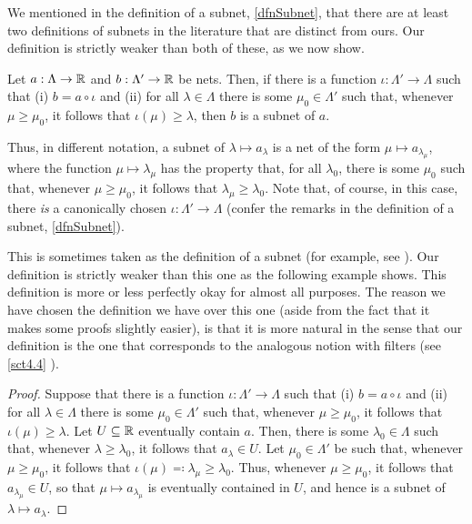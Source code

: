 We mentioned in the definition of a subnet, \cref{dfnSubnet}, that there are at least two definitions of subnets in the literature that are distinct from ours.  Our definition is strictly weaker than both of these, as we now show.
\begin{prp}\label{prp3.3.92}
Let $a:\Lambda \rightarrow \mathbb{R}$ and $b:\Lambda '\rightarrow \mathbb{R}$ be nets.  Then, if there is a function $\iota :\Lambda '\rightarrow \Lambda$ such that (i) $b=a\circ \iota$ and (ii) for all $\lambda \in \Lambda$ there is some $\mu _0\in \Lambda '$ such that, whenever $\mu \geq \mu _0$, it follows that $\iota (\mu )\geq \lambda$, then $b$ is a subnet of $a$.
\begin{rmk}
Thus, in different notation, a subnet of $\lambda \mapsto a_\lambda$ is a net of the form $\mu \mapsto a_{\lambda _\mu}$, where the function $\mu \mapsto \lambda _\mu$ has the property that, for all $\lambda _0$, there is some $\mu _0$ such that, whenever $\mu \geq \mu _0$, it follows that $\lambda _\mu \geq \lambda _0$.  Note that, of course, in this case, there \emph{is} a canonically chosen $\iota :\Lambda '\rightarrow \Lambda $ (confer the remarks in the definition of a subnet, \cref{dfnSubnet}).
\end{rmk}
\begin{rmk}
This is sometimes taken as the definition of a subnet (for example, see \cite[pg.~70]{Kelley}).  Our definition is strictly weaker than this one as the following example shows.  This definition is more or less perfectly okay for almost all purposes.  The reason we have chosen the definition we have over this one (aside from the fact that it makes some proofs slightly easier), is that it is more natural in the sense that our definition is the one that corresponds to the analogous notion with filters (see \cref{sct4.4} ).
\end{rmk}
\begin{proof}
Suppose that there is a function $\iota :\Lambda '\rightarrow \Lambda$ such that (i) $b=a\circ \iota$ and (ii) for all $\lambda \in \Lambda$ there is some $\mu _0\in \Lambda '$ such that, whenever $\mu \geq \mu _0$, it follows that $\iota (\mu )\geq \lambda$. Let $U\subseteq \mathbb{R}$ eventually contain $a$.  Then, there is some $\lambda _0\in \Lambda$ such that, whenever $\lambda \geq \lambda _0$, it follows that $a_\lambda \in U$.  Let $\mu _0\in \Lambda '$ be such that, whenever $\mu \geq \mu _0$, it follows that $\iota (\mu )\eqqcolon \lambda _\mu \geq \lambda _0$.  Thus, whenever $\mu \geq \mu _0$, it follows that $a_{\lambda _\mu}\in U$, so that $\mu \mapsto a_{\lambda _\mu}$ is eventually contained in $U$, and hence is a subnet of $\lambda \mapsto a_\lambda$.
\end{proof}
\end{prp}
